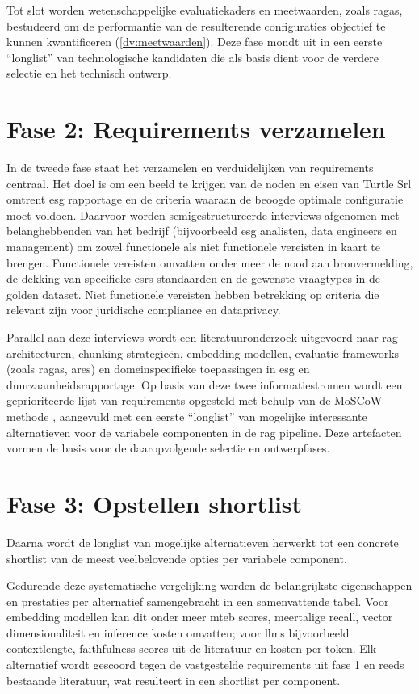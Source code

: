 Tot slot worden wetenschappelijke evaluatiekaders en meetwaarden, zoals \gls{ragas}, bestudeerd om de performantie van de resulterende configuraties objectief te kunnen kwantificeren (\ref{dv:meetwaarden}). Deze fase mondt uit in een eerste ``longlist'' van technologische kandidaten die als basis dient voor de verdere selectie en het technisch ontwerp.

\section{Fase 2: Requirements verzamelen}

In de tweede fase staat het verzamelen en verduidelijken van requirements centraal. Het doel is om een beeld te krijgen van de noden en eisen van Turtle Srl omtrent \gls{esg} rapportage en de criteria waaraan de beoogde optimale configuratie moet voldoen. Daarvoor worden semigestructureerde interviews afgenomen met belanghebbenden van het bedrijf (bijvoorbeeld \gls{esg} analisten, data engineers en management) om zowel functionele als niet functionele vereisten in kaart te brengen. Functionele vereisten omvatten onder meer de nood aan bronvermelding, de dekking van specifieke \gls{esrs} standaarden en de gewenste vraagtypes in de golden dataset. Niet functionele vereisten hebben betrekking op criteria die relevant zijn voor juridische compliance en dataprivacy.

Parallel aan deze interviews wordt een literatuuronderzoek uitgevoerd naar \gls{rag} architecturen, chunking strategieën, embedding modellen, evaluatie frameworks (zoals \gls{ragas}, \gls{ares}) en domeinspecifieke toepassingen in \gls{esg}  en duurzaamheidsrapportage. Op basis van deze twee informatiestromen wordt een geprioriteerde lijst van requirements opgesteld met behulp van de MoSCoW-methode , aangevuld met een eerste ``longlist'' van mogelijke interessante alternatieven voor de variabele componenten in de \gls{rag} pipeline. Deze artefacten vormen de basis voor de daaropvolgende selectie  en ontwerpfases.

\section{Fase 3: Opstellen shortlist}

Daarna wordt de longlist van mogelijke alternatieven herwerkt tot een concrete shortlist van de meest veelbelovende opties per variabele component.

Gedurende deze systematische vergelijking worden de belangrijkste eigenschappen en prestaties per alternatief samengebracht in een samenvattende tabel. Voor embedding modellen kan dit onder meer \gls{mteb} scores, meertalige recall, vector dimensionaliteit en inference kosten omvatten; voor \glspl{llm} bijvoorbeeld contextlengte, faithfulness scores uit de literatuur en kosten per token. Elk alternatief wordt gescoord tegen de vastgestelde requirements uit fase 1 en reeds bestaande literatuur, wat resulteert in een shortlist per component.

